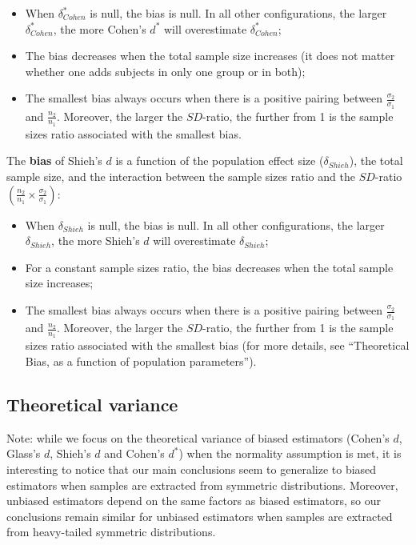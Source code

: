 \documentclass[
  english,
  man,mask,floatsintext]{apa6}
\providecommand{\tightlist}{%
  \setlength{\itemsep}{0pt}\setlength{\parskip}{0pt}}
\begin{document}
\begin{itemize}
\tightlist
\item
  When \(\delta^*_{Cohen}\) is null, the bias is null. In all other configurations, the larger \(\delta^*_{Cohen}\), the more Cohen's \(d^*\) will overestimate \(\delta^*_{Cohen}\);\\
\item
  The bias decreases when the total sample size increases (it does not matter whether one adds subjects in only one group or in both);
\item
  The smallest bias always occurs when there is a positive pairing between \(\frac{\sigma_2}{\sigma_1}\) and \(\frac{n_2}{n_1}\). Moreover, the larger the \(SD\)-ratio, the further from 1 is the sample sizes ratio associated with the smallest bias.
\end{itemize}

The \textbf{bias} of Shieh's \(d\) is a function of the population effect size (\(\delta_{Shieh}\)), the total sample size, and the interaction between the sample sizes ratio and the \(SD\)-ratio \(\left(\frac{n_2}{n_1}\times\frac{\sigma_2}{\sigma_1} \right)\):

\begin{itemize}
\tightlist
\item
  When \(\delta_{Shieh}\) is null, the bias is null. In all other configurations, the larger \(\delta_{Shieh}\), the more Shieh's \(d\) will overestimate \(\delta_{Shieh}\);\\
\item
  For a constant sample sizes ratio, the bias decreases when the total sample size increases;\\
\item
  The smallest bias always occurs when there is a positive pairing between \(\frac{\sigma_2}{\sigma_1}\) and \(\frac{n_2}{n_1}\). Moreover, the larger the \(SD\)-ratio, the further from 1 is the sample sizes ratio associated with the smallest bias (for more details, see ``Theoretical Bias, as a function of population parameters'').
\end{itemize}

\hypertarget{theoretical-variance}{%
\subsection{Theoretical variance}\label{theoretical-variance}}

Note: while we focus on the theoretical variance of biased estimators (Cohen's \(d\), Glass's \(d\), Shieh's \(d\) and Cohen's \(d^*\)) when the normality assumption is met, it is interesting to notice that our main conclusions seem to generalize to biased estimators when samples are extracted from symmetric distributions. Moreover, unbiased estimators depend on the same factors as biased estimators, so our conclusions remain similar for unbiased estimators when samples are extracted from heavy-tailed symmetric distributions.
\end{document}
